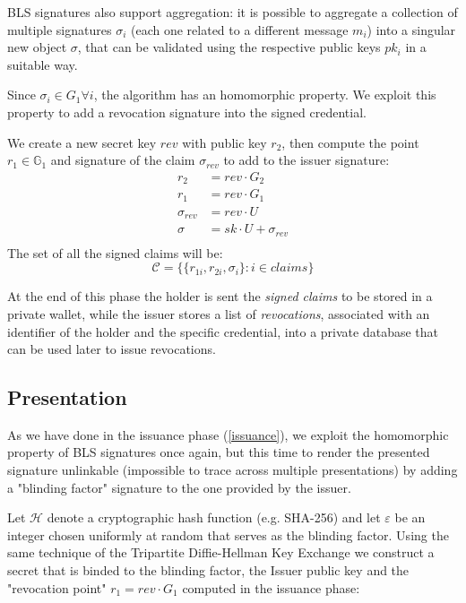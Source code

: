 BLS signatures also support aggregation: it is possible to aggregate a collection of multiple signatures $\sigma_i$ (each one related to a different message $m_i$) into a singular new object $\sigma$, that can be validated using the respective public keys $pk_i$ in a suitable way.

Since $\sigma_i\in G_1 \forall i$, the algorithm has an homomorphic property. We exploit this property to add a revocation signature into the signed credential.

We create a new secret key $rev$ with public key $r_2$, then compute the point $r_1 \in \mathbb{G}_1$ and signature of the claim $\sigma_{rev}$ to add to the issuer signature:
\begin{equation*}\label{rev_agg}
    \begin{split}
        r_2 &= rev \cdot G_2 \\
        r_1 &= rev \cdot G_1 \\
        \sigma_{rev} &= rev \cdot U\\
        \sigma &= sk\cdot U + \sigma_{rev}\\
   \end{split}
\end{equation*}
The set of all the signed claims will be:
\begin{equation*}
   \mathcal{C} = \big\{ \{ r_{1i}, r_{2i}, \sigma_i \} : i\in claims  \big\}
\end{equation*}

At the end of this phase the holder is sent the \textit{signed claims}
to be stored in a private wallet, while the issuer stores
a list of \textit{revocations}, associated with an identifier of the holder and the specific credential, into a private database that can be used later to
issue revocations.



\subsection{Presentation} \label{presentation}

As we have done in the issuance phase (\ref{issuance}), we exploit the
homomorphic property of BLS signatures once again, but this time to
render the presented signature unlinkable (impossible to trace across
multiple presentations) by adding a "blinding factor" signature to the
one provided by the issuer.

Let $\mathcal{H}$ denote a cryptographic hash function (e.g. SHA-256) and let $\varepsilon$ be an integer chosen uniformly at random that serves as the blinding factor.
Using the same technique of the Tripartite Diffie-Hellman Key Exchange \cite{tripartite} we construct a secret that is binded to the blinding factor, the Issuer public key and the "revocation point" $r_1 = rev \cdot G_1$ computed in the issuance phase:

